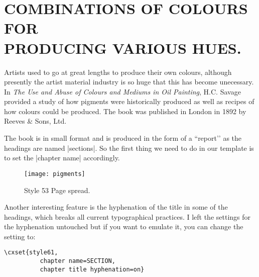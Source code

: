 


\chapter[Combinations of Colours for producing various Hues]{COMBINATIONS OF COLOURS FOR\\ PRODUCING VARIOUS HUES.}

Artists used to go at great lengths to produce their own colours, although presently the artist material industry is so huge that this has become unecessary. In \emph{The Use and Abuse of Colours and Mediums in Oil Painting}, H.C. Savage provided a study of how pigments were historically produced as well as recipes of how colours could be produced. The book was published in London in 1892 by Reeves \& Sons, Ltd. 

The book is in small format and is produced in the form of a ``report’’ as the headings are named |sections|. So the first thing we need to do in our template is to set the |chapter name| accordingly.

\begin{figure}[ht]
\centering
\texttt{[image: pigments]}
\caption{Style 53 Page spread.}
\end{figure}

Another interesting feature is the hyphenation of the title in some of the headings, which breaks all current typographical practices. I left the settings for the hyphenation untouched but if you want to emulate it, you
can change the setting to:

\begin{verbatim}
\cxset{style61,
          chapter name=SECTION,
          chapter title hyphenation=on}
\end{verbatim}










